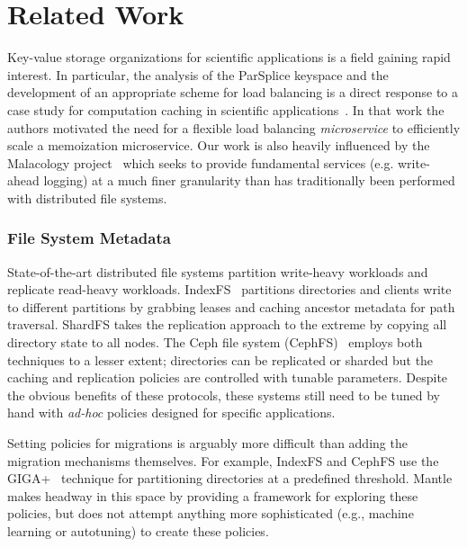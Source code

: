 \section{Related Work}

Key-value storage organizations for scientific applications is a field gaining
rapid interest. In particular, the analysis of the ParSplice keyspace and the
development of an appropriate scheme for load balancing is a direct response to
a case study for computation caching in scientific
applications~\cite{jenkins:ipdsw17-mochi}. In that work the authors motivated
the need for a flexible load balancing \emph{microservice} to efficiently scale
a memoization microservice. Our work is also heavily influenced by the
Malacology project~\cite{sevilla:eurosys17-malacology} which seeks to provide
fundamental services (e.g. write-ahead logging) at a much finer granularity
than has traditionally been performed with distributed file systems.  

\subsubsection*{File System Metadata}

State-of-the-art distributed file systems partition write-heavy workloads and
replicate read-heavy workloads.  IndexFS~\cite{ren:sc2014-indexfs} partitions
directories and clients write to different partitions by grabbing leases and
caching ancestor metadata for path traversal. ShardFS takes the replication
approach to the extreme by copying all directory state to all nodes. The Ceph
file system (CephFS)~\cite{weil:sc2004-dyn-metadata, weil:osdi2006-ceph} employs both
techniques to a lesser extent; directories can be replicated or sharded but the
caching and replication policies are controlled with tunable parameters.
Despite the obvious benefits of these protocols, these systems still need to be
tuned by hand with {\it ad-hoc} policies designed for specific applications. 

Setting policies for migrations is arguably more difficult than adding the
migration mechanisms themselves.  For example, IndexFS and CephFS use the
GIGA+~\cite{patil:fast2011-giga} technique for partitioning directories at a
predefined threshold. Mantle makes headway in this space by providing a
framework for exploring these policies, but does not attempt anything more
sophisticated (e.g., machine learning or autotuning) to create these policies. 

